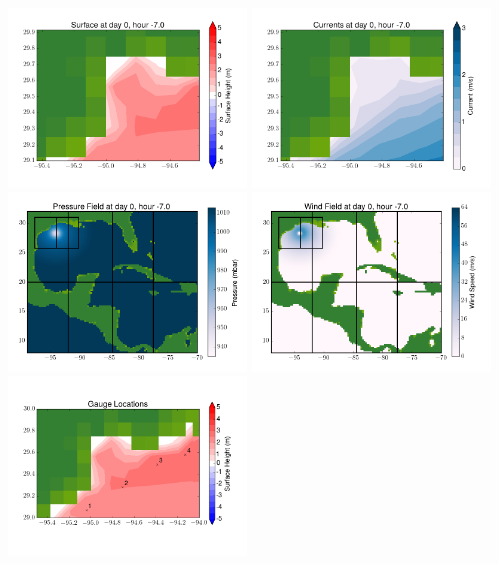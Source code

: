 \documentclass[11pt]{article}
\begin{document}
\includegraphics[width=0.475\textwidth]{frame0065fig6.png}
\vskip 10pt 
\includegraphics[width=0.475\textwidth]{frame0065fig7.png}
\includegraphics[width=0.475\textwidth]{frame0065fig8.png}
\vskip 10pt 
\includegraphics[width=0.475\textwidth]{frame0065fig9.png}
\includegraphics[width=0.475\textwidth]{frame0065fig10.png}
\end{document}
